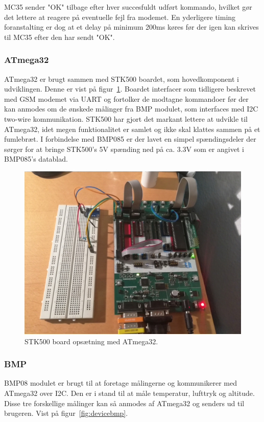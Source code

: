 MC35 sender "OK" tilbage efter hver succesfuldt udført kommando, hvilket gør det lettere at reagere på eventuelle fejl fra modemet. En yderligere timing foranstalting er dog at et delay på minimum 200ms køres
 før der igen kan skrives til MC35 efter den har sendt "OK". 


\subsubsection{ATmega32}
ATmega32 er brugt sammen med STK500 boardet, som hovedkomponent i udviklingen. Denne er vist på figur~\ref{fig:deviceatmege32}. 
Boardet interfacer som tidligere beskrevet med GSM modemet via UART og fortolker de modtagne kommandoer før der kan anmodes om de ønskede målinger fra BMP modulet, som interfaces med I2C two-wire kommunikation.
STK500 har gjort det markant lettere at udvikle til ATmega32, idet megen funktionalitet er samlet og ikke skal klattes sammen på et fumlebræt. I forbindelse med BMP085 er der lavet en simpel
 spændingsdeler der sørger for at bringe STK500's 5V spænding ned på ca. 3.3V som er angivet i BMP085's datablad.

\begin{figure}[h]
	\centering
	\includegraphics[width=0.7\linewidth]{figs/device_atmega32.jpg}
	\caption{STK500 board opsætning med ATmega32.}
	\label{fig:deviceatmege32}
\end{figure}

\subsubsection{BMP}
BMP08 modulet er brugt til at foretage målingerne og kommunikerer med ATmega32 over I2C. Den er i stand til at måle temperatur, lufttryk og altitude. 
Disse tre forskellige målinger kan så anmodes af ATmega32 og senders ud til brugeren. Vist på figur~\ref{fig:devicebmp}.

